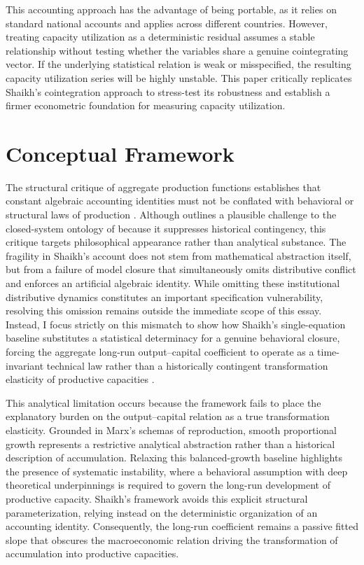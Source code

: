 \documentclass[11pt]{article}
\begin{document}
This accounting approach has the advantage of being portable, as it relies on standard national accounts and applies across different countries. However, treating capacity utilization as a deterministic residual assumes a stable relationship without testing whether the variables share a genuine cointegrating vector. If the underlying statistical relation is weak or misspecified, the resulting capacity utilization series will be highly unstable. This paper critically replicates Shaikh's cointegration approach to stress-test its robustness and establish a firmer econometric foundation for measuring capacity utilization.

\section{Conceptual Framework}
\label{sec:conceptual_framework}

The structural critique of aggregate production functions establishes that constant algebraic accounting identities must not be conflated with behavioral or structural laws of production \citep{Shaikh1974}. Although \citet{Patomaki2017} outlines a plausible challenge to the closed-system ontology of \citet{Shaikh2016} because it suppresses historical contingency, this critique targets philosophical appearance rather than analytical substance. The fragility in Shaikh's account does not stem from mathematical abstraction itself, but from a failure of model closure that simultaneously omits distributive conflict and enforces an artificial algebraic identity. While omitting these institutional distributive dynamics constitutes an important specification vulnerability, resolving this omission remains outside the immediate scope of this essay. Instead, I focus strictly on this mismatch to show how Shaikh's single-equation baseline substitutes a statistical determinacy for a genuine behavioral closure, forcing the aggregate long-run output--capital coefficient to operate as a time-invariant technical law rather than a historically contingent transformation elasticity of productive capacities \citep{Nikiforos2021closure}.


This analytical limitation occurs because the framework fails to place the explanatory burden on the output--capital relation as a true transformation elasticity. Grounded in Marx's schemas of reproduction, smooth proportional growth represents a restrictive analytical abstraction rather than a historical description of accumulation. Relaxing this balanced-growth baseline highlights the presence of systematic instability, where a behavioral assumption with deep theoretical underpinnings is required to govern the long-run development of productive capacity. Shaikh's framework avoids this explicit structural parameterization, relying instead on the deterministic organization of an accounting identity. Consequently, the long-run coefficient remains a passive fitted slope that obscures the macroeconomic relation driving the transformation of accumulation into productive capacities.
\end{document}
